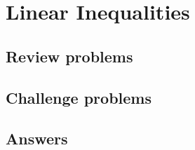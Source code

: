 \section{Linear Inequalities}

\subsection{Review problems}


\subsection{Challenge problems}


\subsection{Answers}